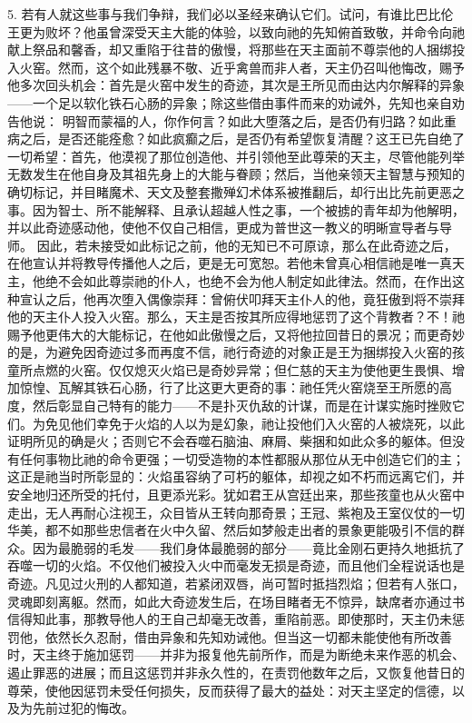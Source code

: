 5. 若有人就这些事与我们争辩，我们必以圣经来确认它们。试问，有谁比巴比伦王更为败坏？他虽曾深受天主大能的体验，以致向祂的先知俯首致敬，并命令向祂献上祭品和馨香，却又重陷于往昔的傲慢，将那些在天主面前不尊崇他的人捆绑投入火窑。然而，这个如此残暴不敬、近乎禽兽而非人者，天主仍召叫他悔改，赐予他多次回头机会：首先是火窑中发生的奇迹，其次是王所见而由达内尔解释的异象——一个足以软化铁石心肠的异象；除这些借由事件而来的劝诫外，先知也亲自劝告他说： 明智而蒙福的人，你作何言？如此大堕落之后，是否仍有归路？如此重病之后，是否还能痊愈？如此疯癫之后，是否仍有希望恢复清醒？这王已先自绝了一切希望：首先，他漠视了那位创造他、并引领他至此尊荣的天主，尽管他能列举无数发生在他自身及其祖先身上的大能与眷顾；然后，当他亲领天主智慧与预知的确切标记，并目睹魔术、天文及整套撒殚幻术体系被推翻后，却行出比先前更恶之事。因为智士、所不能解释、且承认超越人性之事，一个被掳的青年却为他解明，并以此奇迹感动他，使他不仅自己相信，更成为普世这一教义的明晰宣导者与导师。 因此，若未接受如此标记之前，他的无知已不可原谅，那么在此奇迹之后，在他宣认并将教导传播他人之后，更是无可宽恕。若他未曾真心相信祂是唯一真天主，他绝不会如此尊崇祂的仆人，也绝不会为他人制定如此律法。然而，在作出这种宣认之后，他再次堕入偶像崇拜：曾俯伏叩拜天主仆人的他，竟狂傲到将不崇拜他的天主仆人投入火窑。那么，天主是否按其所应得地惩罚了这个背教者？不！祂赐予他更伟大的大能标记，在他如此傲慢之后，又将他拉回昔日的景况；而更奇妙的是，为避免因奇迹过多而再度不信，祂行奇迹的对象正是王为捆绑投入火窑的孩童所点燃的火窑。仅仅熄灭火焰已是奇妙异常；但仁慈的天主为使他更生畏惧、增加惊惶、瓦解其铁石心肠，行了比这更大更奇的事：祂任凭火窑烧至王所愿的高度，然后彰显自己特有的能力——不是扑灭仇敌的计谋，而是在计谋实施时挫败它们。为免见他们幸免于火焰的人以为是幻象，祂让投他们入火窑的人被烧死，以此证明所见的确是火；否则它不会吞噬石脑油、麻屑、柴捆和如此众多的躯体。但没有任何事物比祂的命令更强；一切受造物的本性都服从那位从无中创造它们的主；这正是祂当时所彰显的：火焰虽容纳了可朽的躯体，却视之如不朽而远离它们，并安全地归还所受的托付，且更添光彩。犹如君王从宫廷出来，那些孩童也从火窑中走出，无人再耐心注视王，众目皆从王转向那奇景；王冠、紫袍及王室仪仗的一切华美，都不如那些忠信者在火中久留、然后如梦般走出者的景象更能吸引不信的群众。因为最脆弱的毛发——我们身体最脆弱的部分——竟比金刚石更持久地抵抗了吞噬一切的火焰。不仅他们被投入火中而毫发无损是奇迹，而且他们全程说话也是奇迹。凡见过火刑的人都知道，若紧闭双唇，尚可暂时抵挡烈焰；但若有人张口，灵魂即刻离躯。然而，如此大奇迹发生后，在场目睹者无不惊异，缺席者亦通过书信得知此事，那教导他人的王自己却毫无改善，重陷前恶。即使那时，天主仍未惩罚他，依然长久忍耐，借由异象和先知劝诫他。但当这一切都未能使他有所改善时，天主终于施加惩罚——并非为报复他先前所作，而是为断绝未来作恶的机会、遏止罪恶的进展；而且这惩罚并非永久性的，在责罚他数年之后，又恢复他昔日的尊荣，使他因惩罚未受任何损失，反而获得了最大的益处：对天主坚定的信德，以及为先前过犯的悔改。\par

